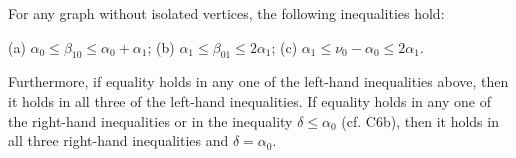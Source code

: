 For any graph without isolated vertices, the following inequalities hold:

(a) $\alpha_0 \leq \beta_{10} \leq \alpha_0 + \alpha_1$;
(b) $\alpha_1 \leq \beta_{01} \leq 2\alpha_1$;
(c) $\alpha_1 \leq \nu_0 - \alpha_0 \leq 2\alpha_1$.

Furthermore, if equality holds in any one of the left-hand inequalities above, then it holds in all three of the left-hand inequalities. If equality holds in any one of the right-hand inequalities or in the inequality $\delta \leq \alpha_0$ (cf. C6b), then it holds in all three right-hand inequalities and $\delta = \alpha_0$.
